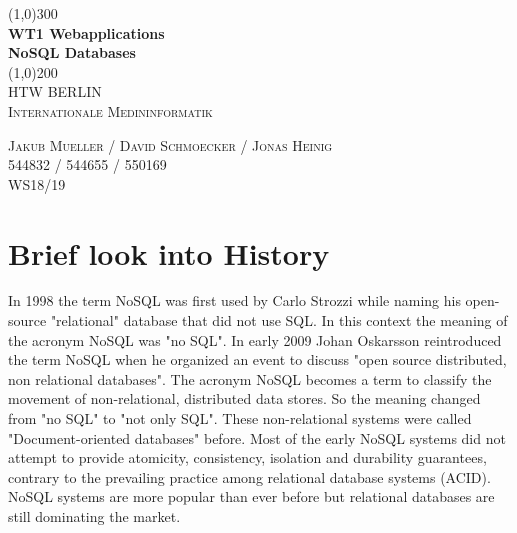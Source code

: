 \documentclass[11pt]{article}
\begin{document}
\begin{titlepage} 
	\begin{center}
	\line(1,0){300} \\
	[4mm]
	\huge{\bfseries WT1 Webapplications \\ NoSQL Databases} \\
	[2mm]
	\line(1,0){200}\\	
	[1.5cm]
	\textsc{\LARGE HTW BERLIN}\\
	[0.75cm]
	\textsc{\LARGE Internationale Medininformatik} \\  
	[9cm]
	\end{center}	 
	\begin{flushright}
		\textsc{\large Jakub Mueller / David Schmoecker / Jonas Heinig \\
		544832 / 544655 / 550169 \\
		WS18/19\\}
	\end{flushright} 
	 
	
	
\end{titlepage}  
 

\tableofcontents
  
\cleardoublepage %




\setcounter{page}{1} %



\section{Brief look into History} 
In 1998 the term NoSQL was first used by Carlo Strozzi while naming his open-source "relational" database that did not use SQL. In this context the meaning of the acronym NoSQL was "no SQL".
In early 2009 Johan Oskarsson reintroduced the term NoSQL when he organized an event to discuss "open source distributed, non relational databases". The acronym NoSQL becomes a term to classify the movement of non-relational, distributed data stores. So the meaning changed from "no SQL" to "not only SQL".
These non-relational systems were called "Document-oriented databases" before. Most of the early NoSQL systems did not attempt to provide atomicity, consistency, isolation and durability guarantees,  contrary to the prevailing practice among relational database systems (ACID).
NoSQL systems are more popular than ever before but relational databases are still dominating the market.  
\end{document}
